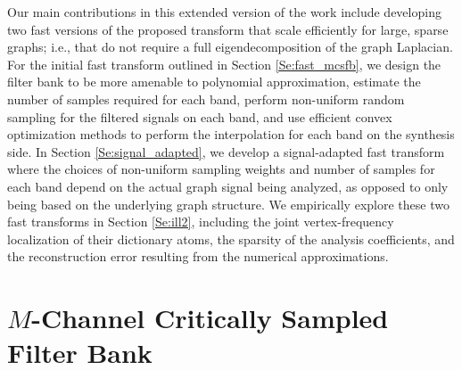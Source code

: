 \documentclass[journal, 10pt]{IEEEtran}
\begin{document}
Our main contributions in this extended version of the work include developing two fast versions of the proposed transform that scale efficiently for large, sparse graphs; i.e., that do not require a full eigendecomposition of the graph Laplacian. For the initial fast transform outlined in Section \ref{Se:fast_mcsfb}, we design the filter bank to be more amenable to polynomial approximation, estimate the number of samples required for each band, perform non-uniform random sampling for the filtered signals on each band, and use efficient convex optimization methods to perform the interpolation for each band on the synthesis side. In Section \ref{Se:signal_adapted}, we develop a signal-adapted fast transform where the choices of non-uniform sampling weights and number of samples for each band depend on the actual graph signal being analyzed, as opposed to only being based on the underlying graph structure. We 
empirically explore these two fast transforms in Section \ref{Se:ill2},  including the joint vertex-frequency localization of their dictionary atoms, the sparsity of the analysis coefficients, and the reconstruction error resulting from the numerical approximations.


\section{$M$-Channel Critically Sampled Filter Bank} \label{Se:fb_design}
\end{document}
